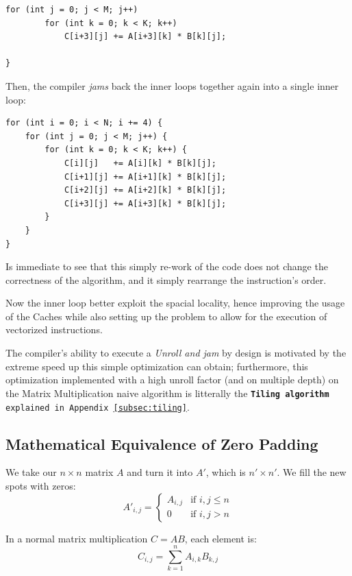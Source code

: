 \begin{appendices}
\begin{lstlisting}[style=CStyle, caption={Loop unrolled (factor of $4$)}]
    for (int j = 0; j < M; j++)
        for (int k = 0; k < K; k++)
            C[i+3][j] += A[i+3][k] * B[k][j];

}
\end{lstlisting}

Then, the compiler \emph{jams} back the inner loops together again  into a single inner loop:

\begin{lstlisting}[style=CStyle, caption={Loop unrolled (factor of $4$)  and jammed}]
for (int i = 0; i < N; i += 4) {
    for (int j = 0; j < M; j++) {
        for (int k = 0; k < K; k++) {
            C[i][j]   += A[i][k] * B[k][j];
            C[i+1][j] += A[i+1][k] * B[k][j];
            C[i+2][j] += A[i+2][k] * B[k][j];
            C[i+3][j] += A[i+3][k] * B[k][j];
        }
    }
}
\end{lstlisting}

Is immediate to see that this simply  re-work  of the code does not change the correctness of the algorithm, and it simply rearrange the instruction's order.

Now the inner loop better exploit the spacial locality, hence improving the usage of the Caches while also setting up the problem to  allow for the execution of vectorized instructions.

The compiler's ability to execute a \emph{Unroll and jam} by design is motivated by the extreme speed up this simple optimization can  obtain; furthermore, this optimization implemented with a high unroll factor (and on multiple depth) on the Matrix Multiplication naive algorithm is litterally the \texttt{\textbf{Tiling algorithm} explained in Appendix~\ref{subsec:tiling}}.



\subsection{Mathematical Equivalence of Zero Padding}\label{subsec:padding}

We take our $n \times n$ matrix $A$ and turn it into $A'$, which is $n' \times n'$. We fill the new spots with zeros:
\[
A'_{i,j} = 
\begin{cases} 
A_{i,j} & \text{if } i, j \leq n \\
0 & \text{if } i, j > n
\end{cases}
\]

In a normal matrix multiplication $C = AB$, each element is:
\[ C_{i,j} = \sum_{k=1}^{n} A_{i,k} B_{k,j} \]


\end{appendices}
